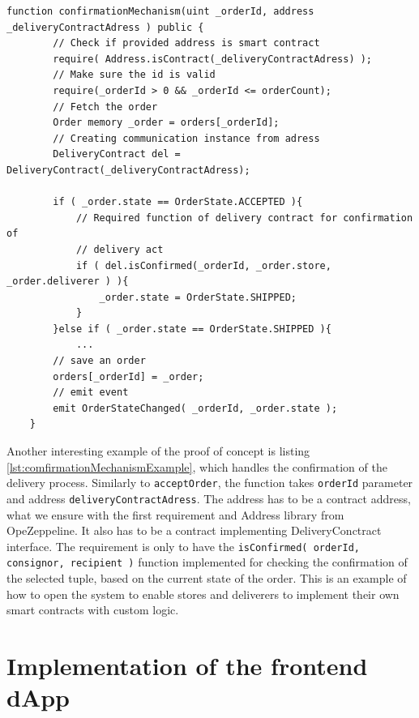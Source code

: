 \documentclass[thesis=M,english]{FITthesis}[2019/12/23]
\begin{document}
\label{}
\begin{lstlisting}[caption=OrderLogicContract.sol confirmation mechanism example, label={lst:comfirmationMechanismExample}]
    function confirmationMechanism(uint _orderId, address _deliveryContractAdress ) public {
        // Check if provided address is smart contract
        require( Address.isContract(_deliveryContractAdress) );
        // Make sure the id is valid
        require(_orderId > 0 && _orderId <= orderCount);
        // Fetch the order
        Order memory _order = orders[_orderId];
        // Creating communication instance from adress
        DeliveryContract del = DeliveryContract(_deliveryContractAdress);

        if ( _order.state == OrderState.ACCEPTED ){
            // Required function of delivery contract for confirmation of
            // delivery act 
            if ( del.isConfirmed(_orderId, _order.store, _order.deliverer ) ){
                _order.state = OrderState.SHIPPED;
            }
        }else if ( _order.state == OrderState.SHIPPED ){
            ...
        // save an order    
        orders[_orderId] = _order;
        // emit event
        emit OrderStateChanged( _orderId, _order.state );
    }

\end{lstlisting}

Another interesting example of the proof of concept is listing \ref{lst:comfirmationMechanismExample}, which handles the confirmation of the delivery process. Similarly to \texttt{acceptOrder}, the function takes \texttt{orderId} parameter and address \texttt{deliveryContractAdress}. The address has to be a contract address, what we ensure with the first requirement and Address library from OpeZeppeline. It also has to be a contract implementing DeliveryConctract interface. The requirement is only to have the \texttt{isConfirmed( orderId, consignor, recipient )} function implemented for checking the confirmation of the selected tuple, based on the current state of the order. This is an example of how to open the system to enable stores and deliverers to implement their own smart contracts with custom logic.





\section{Implementation of the frontend dApp}
\end{document}
